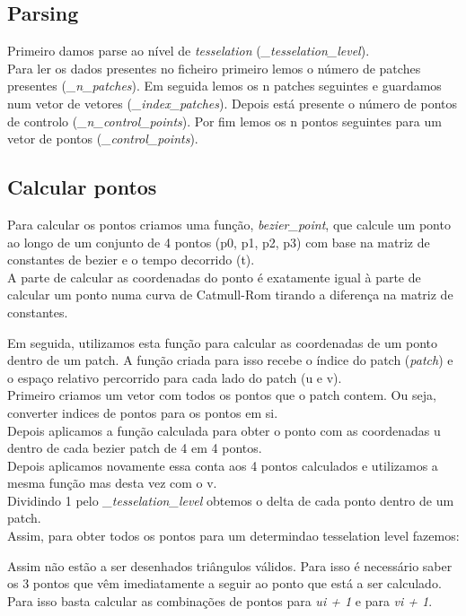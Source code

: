 \documentclass[a4paper]{report}
\begin{document}
\subsection{Parsing}
Primeiro damos parse ao nível de \textit{tesselation}
(\textit{\_tesselation\_level}).\\
Para ler os dados presentes no ficheiro primeiro lemos o número de patches
presentes (\textit{\_n\_patches}). Em seguida lemos os n patches seguintes e
guardamos num vetor de vetores (\textit{\_index\_patches}). Depois está presente
o número de pontos de controlo (\textit{\_n\_control\_points}). Por fim lemos os
n pontos seguintes para um vetor de pontos (\textit{\_control\_points}).

\subsection{Calcular pontos}
Para calcular os pontos criamos uma função, \textit{bezier\_point}, que calcule
um ponto ao longo de um conjunto de 4 pontos (p0, p1, p2, p3) com base na matriz
de constantes de bezier e o tempo decorrido (t).\\
A parte de calcular as coordenadas do ponto é exatamente igual à parte de
calcular um ponto numa curva de Catmull-Rom tirando a diferença na matriz de
constantes.


Em seguida, utilizamos esta função para calcular as coordenadas de um ponto
dentro de um patch. A função criada para isso recebe o índice do patch
(\textit{patch}) e o espaço relativo percorrido para cada lado do patch (u e
v).\\
Primeiro criamos um vetor com todos os pontos que o patch contem. Ou seja,
converter indices de pontos para os pontos em si.\\
Depois aplicamos a função calculada para obter o ponto com as coordenadas u
dentro de cada bezier patch de 4 em 4 pontos.\\
Depois aplicamos novamente essa conta aos 4 pontos calculados e utilizamos a
mesma função mas desta vez com o v.\\


Dividindo 1 pelo \textit{\_tesselation\_level} obtemos o delta de cada ponto
dentro de um patch.\\
Assim, para obter todos os pontos para um determindao tesselation level fazemos:


Assim não estão a ser desenhados triângulos válidos. Para isso é necessário
saber os 3 pontos que vêm imediatamente a seguir ao ponto que está a ser
calculado. Para isso basta calcular as combinações de pontos para \textit{ui +
1} e para \textit{vi + 1}.
\end{document}
